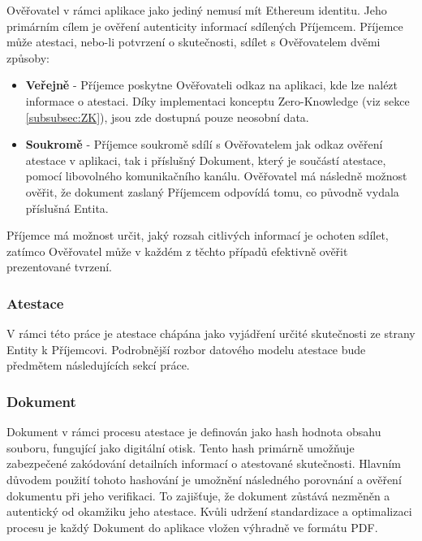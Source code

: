 Ověřovatel v rámci aplikace jako jediný nemusí mít Ethereum identitu. Jeho primárním cílem je ověření autenticity informací sdílených Příjemcem. Příjemce může atestaci, nebo-li potvrzení o skutečnosti, sdílet s Ověřovatelem dvěmi způsoby:

\begin{itemize}
	 
	 \item \textbf{Veřejně} - Příjemce poskytne Ověřovateli odkaz na aplikaci, kde lze nalézt informace o atestaci. Díky implementaci konceptu Zero-Knowledge (viz sekce \ref{subsubsec:ZK}), jsou zde dostupná pouze neosobní data.
	 
	 \item \textbf{Soukromě} - Příjemce soukromě sdílí s Ověřovatelem jak odkaz ověření atestace v aplikaci, tak i příslušný Dokument, který je součástí atestace, pomocí libovolného komunikačního kanálu. Ověřovatel má následně možnost ověřit, že dokument zaslaný Příjemcem odpovídá tomu, co původně vydala příslušná Entita. 
 
\end{itemize}

Příjemce má možnost určit, jaký rozsah citlivých informací je ochoten sdílet, zatímco Ověřovatel může v každém z těchto případů efektivně ověřit prezentované tvrzení.



\subsubsection{Atestace}\label{subsubsec:terminology-attestation}

V rámci této práce je atestace chápána jako vyjádření určité skutečnosti ze strany Entity k Příjemcovi. Podrobnější rozbor datového modelu atestace bude předmětem následujících sekcí práce.




\subsubsection{Dokument}


Dokument v rámci procesu atestace je definován jako hash hodnota obsahu souboru, fungující jako digitální otisk. Tento hash primárně umožňuje zabezpečené zakódování detailních informací o atestované skutečnosti. Hlavním důvodem použití tohoto hashování je umožnění následného porovnání a ověření dokumentu při jeho verifikaci. To zajišťuje, že dokument zůstává nezměněn a autentický od okamžiku jeho atestace. Kvůli udržení standardizace a optimalizaci procesu je každý Dokument do aplikace vložen výhradně ve formátu PDF.




